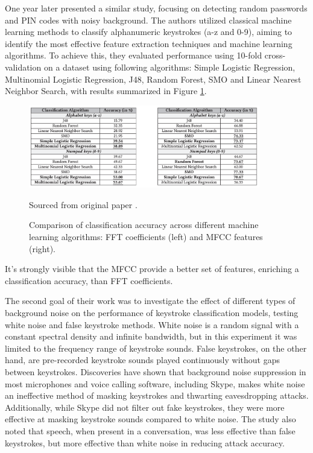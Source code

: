 \documentclass[a4paper,11pt,twoside]{report}
\theoremstyle{definition}
\begin{document}
One year later \textit{\cite{anand2018keyboard}} presented a similar study, focusing on detecting random passwords and PIN codes with noisy background. The authors utilized classical machine learning methods to classify alphanumeric keystrokes (a-z and 0-9), aiming to identify the most effective feature extraction techniques and machine learning algorithms. To achieve this, they evaluated performance using 10-fold cross-validation on a dataset using following algorithms: Simple Logistic Regression, Multinomial Logistic Regression, J48, Random Forest, SMO and Linear Nearest Neighbor Search, with results summarized in Figure \ref{fig:anand2018}.

\begin{figure}[h!]
    \centering
    \includegraphics[width=0.9\textwidth]{img_related_work/fft_vs_mfcc.png}
    \caption{Comparison of classification accuracy across different machine learning algorithms: FFT coefficients (left) and MFCC features (right).}
    \footnotesize{Sourced from original paper \cite{anand2018keyboard}.}
    \label{fig:anand2018}
\end{figure}

It's strongly visible that the MFCC provide a better set of features, enriching a classification accuracy, than FFT coefficients.

The second goal of their work was to investigate the effect of different types of background noise on the performance of keystroke classification models, testing white noise and false keystroke methods. White noise is a random signal with a constant spectral density and infinite bandwidth, but in this experiment it was limited to the frequency range of keystroke sounds. False keystrokes, on the other hand, are pre-recorded keystroke sounds played continuously without gaps between keystrokes. Discoveries have shown that background noise suppression in most microphones and voice calling software, including Skype, makes white noise an ineffective method of masking keystrokes and thwarting eavesdropping attacks. Additionally, while Skype did not filter out fake keystrokes, they were more effective at masking keystroke sounds compared to white noise. The study also noted that speech, when present in a conversation, was less effective than false keystrokes, but more effective than white noise in reducing attack accuracy. \\
\end{document}
